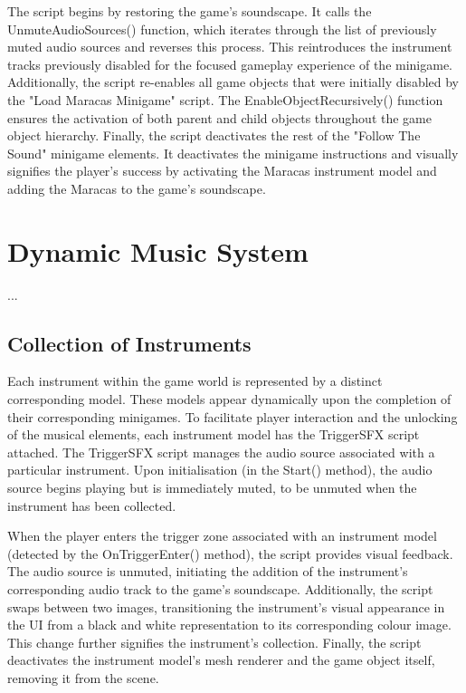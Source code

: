 \documentclass{l4proj}
\begin{document}
The script begins by restoring the game's soundscape. It calls the UnmuteAudioSources() function, which iterates through the list of previously muted audio sources and reverses this process. This reintroduces the instrument tracks previously disabled for the focused gameplay experience of the minigame. Additionally, the script re-enables all game objects that were initially disabled by the "Load Maracas Minigame" script. The EnableObjectRecursively() function ensures the activation of both parent and child objects throughout the game object hierarchy. Finally, the script deactivates the rest of the "Follow The Sound" minigame elements. It deactivates the minigame instructions and visually signifies the player's success by activating the Maracas instrument model and adding the Maracas to the game's soundscape.

\section{Dynamic Music System}
...

\subsection{Collection of Instruments}
Each instrument within the game world is represented by a distinct corresponding model. These models appear dynamically upon the completion of their corresponding minigames. To facilitate player interaction and the unlocking of the musical elements, each instrument model has the TriggerSFX script attached. The TriggerSFX script manages the audio source associated with a particular instrument. Upon initialisation (in the Start() method), the audio source begins playing but is immediately muted, to be unmuted when the instrument has been collected.

When the player enters the trigger zone associated with an instrument model (detected by the OnTriggerEnter() method), the script provides visual feedback. The audio source is unmuted, initiating the addition of the instrument's corresponding audio track to the game's soundscape. Additionally, the script swaps between two images, transitioning the instrument's visual appearance in the UI from a black and white representation to its corresponding colour image. This change further signifies the instrument's collection. Finally, the script deactivates the instrument model's mesh renderer and the game object itself, removing it from the scene.
\end{document}
